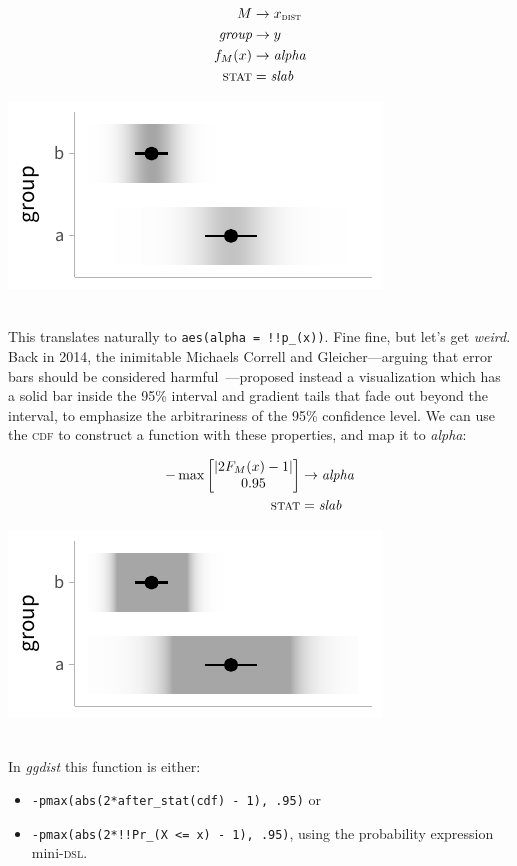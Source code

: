 \documentclass[journal]{vgtc}                     %
\newcommand{\equationfigure}[2]{%
\noindent
\begin{minipage}{.5\columnwidth}
\setlength{\abovedisplayskip}{0pt}
\setlength{\belowdisplayskip}{0pt}
#1\end{minipage}%
\begin{minipage}{.4\columnwidth}\centering #2 \end{minipage}%
\vspace{.5\belowdisplayskip}\\
}
\begin{document}
\equationfigure{
\begin{align*}
M &\rightarrow x_\textsc{dist}\\
\textit{group} &\rightarrow y\\
f_M(x) &\rightarrow \textit{alpha}\\
\textsc{stat} &= \mathit{slab}
\end{align*}
}{\includegraphics[width=1.2\columnwidth]{figs/3-slab_gradient_two_groups.pdf}}
This translates naturally to \texttt{aes(alpha = !!p\_(x))}. Fine fine, but let's get \textit{weird}. Back in 2014, the inimitable Michaels Correll and Gleicher---arguing that error bars should be considered harmful~\cite{correll2014error}---proposed instead a visualization which has a solid bar inside the 95\% interval and gradient tails that fade out beyond the interval, to emphasize the arbitrariness of the 95\% confidence level. We can use the \textsc{cdf} to construct a function with these properties, and map it to \textit{alpha}:

\equationfigure{
\begin{align*}
-\max \left[ \begin{matrix} \lvert 2 F_M(x) - 1 \rvert \\ 0.95 \end{matrix} \right] &\rightarrow \textit{alpha}\\
\textsc{stat} &= \mathit{slab}
\end{align*}
}{\includegraphics[width=1.2\columnwidth]{figs/3-slab_gradient_correll.pdf}}
In \textit{ggdist} this function is either:
\begin{itemize}
    \item \texttt{-pmax(abs(2*after\_stat(cdf) - 1), .95)} or
    \item    \texttt{-pmax(abs(2*!!Pr\_(X <= x) - 1), .95)}, using the probability expression mini-\textsc{dsl}.
\end{itemize}
\end{document}
